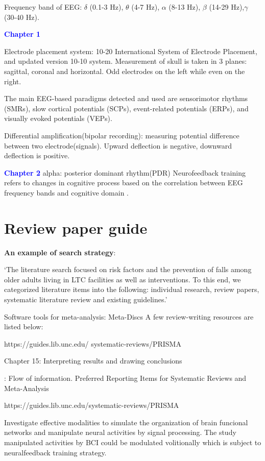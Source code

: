 \documentclass{article}
\begin{document}
Frequency band of EEG: $\delta$ (0.1-3 Hz), $\theta$ (4-7 Hz), $\alpha$ (8-13 Hz), $\beta$ (14-29 Hz),$\gamma$ (30-40 Hz).

\textcolor{blue}{\textbf{Chapter 1}}


Electrode placement system: 10-20 International System of Electrode Placement, and updated version 10-10 system. Measurement of skull is taken in 3 planes: sagittal, coronal and horizontal. Odd electrodes on the left while even on the right.

The main EEG-based paradigms detected and used are sensorimotor rhythms (SMRs), slow cortical potentials (SCPs), event-related potentials (ERPs), and visually evoked potentials (VEPs).

Differential amplification(bipolar recording): measuring potential difference between two electrode(signals). Upward deflection is negative, downward deflection is positive.

\textcolor{blue}{\textbf{Chapter 2}}
alpha: posterior dominant rhythm(PDR)
Neurofeedback training refers to changes in cognitive process based on the correlation between EEG frequency bands and cognitive domain \cite{Lecomte_2011}. 
\section{Review paper guide}

\textbf{An example of search strategy}: 

‘The literature search focused on risk factors and the prevention of falls among older adults living in LTC facilities as well as interventions. To this end, we categorized literature items into the following: individual research, review papers, systematic literature review and existing guidelines.’

Software tools for  meta-analysis: Meta-Discs
A few review-writing resources are listed below: \par
https://guides.lib.unc.edu/
systematic-reviews/PRISMA

\begin{description}[font=$\bullet$~\normalfont\textbf]
\item [Cochrane Handbook:] Chapter 15: Interpreting results and drawing conclusions
\item [PRISMA]: Flow of information. Preferred Reporting Items for Systematic Reviews and Meta-Analysis
\item [JBI Manual for Evidence Synthesis - Chapter 12.3 The systematic review] 
\end{description}
https://guides.lib.unc.edu/systematic-reviews/PRISMA

Investigate effective modalities to simulate the organization 
of brain funcional networks and manipulate neural activities by 
signal processing. The study manipulated activities by BCI 
could be modulated volitionally which is subject to neuralfeedback training 
strategy.

\printbibliography
\end{document}
